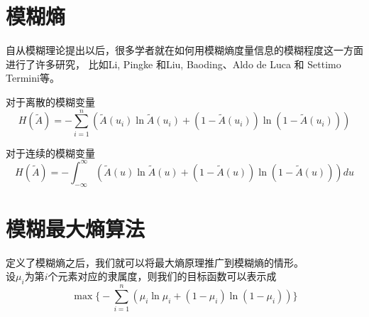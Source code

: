 \section{模糊熵}
自从模糊理论提出以后，很多学者就在如何用模糊熵度量信息的模糊程度这一方面进行了许多研究，
比如Li, Pingke 和Liu, Baoding\cite{li2008entropy}、Aldo de Luca 和 Settimo Termini\cite{RN3}等。
\begin{definition}[模糊熵]
    对于离散的模糊变量
    \begin{equation}
        H(\tilde{A})=-\sum_{i=1}^{n}\left(\tilde{A}(u_i) \ln \tilde{A}(u_i)+\left(1-\tilde{A}(u_i)\right) \ln \left(1-\tilde{A}(u_i)\right)\right)
    \end{equation}

    对于连续的模糊变量
    \begin{equation}
        H(\tilde{A})=-\int_{-\infty}^{\infty}(\tilde{A}(u) \ln \tilde{A}(u)+(1-\tilde{A}(u)) \ln (1-\tilde{A}(u))) d u
    \end{equation}

\end{definition}

\newpage
\section{模糊最大熵算法}
定义了模糊熵之后，我们就可以将最大熵原理推广到模糊熵的情形。\\
设$\mu_i$为第$i$个元素对应的隶属度，则我们的目标函数可以表示成
\[
    \max \biggl\{-\sum_{i=1}^{n}\left(\mu_i \ln \mu_i+\left(1-\mu_i\right) \ln \left(1-\mu_i\right)\right)\biggr\}
\]